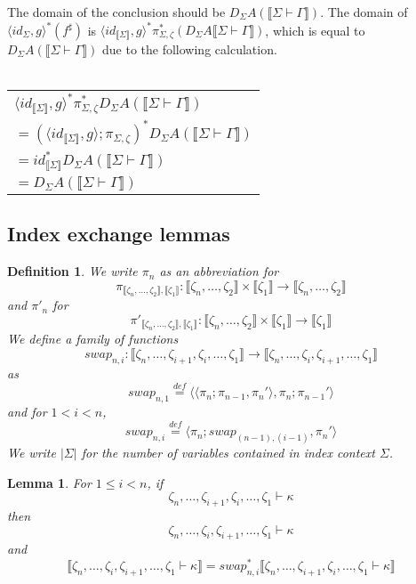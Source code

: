 \documentclass{article}
\newtheorem{lemma}{Lemma}
\newtheorem{definition}{Definition}
\newcommand{\sem}[1]{\llbracket #1 \rrbracket}
\newcommand{\defeq}{\overset{\mathit{def}}{=}}
\begin{document}
\subsubsection*{}

The domain of the conclusion should be $D_{\Sigma}A(\sem{\Sigma \vdash \Gamma})$. The domain of $\langle \mathit{id}_{\Sigma}, g \rangle^*(f^\sharp)$ is $\langle \mathit{id}_{\sem{\Sigma}}, g \rangle^* \pi_{\Sigma,\zeta}^*(D_{\Sigma} A \sem{\Sigma \vdash \Gamma})$, which is equal to $D_{\Sigma}A(\sem{\Sigma \vdash \Gamma})$ due to the following calculation.\\~\\
\begin{tabu}{l}
$\langle \mathit{id}_{\sem{\Sigma}}, g \rangle^* \pi_{\Sigma,\zeta}^* D_{\Sigma} A (\sem{\Sigma \vdash \Gamma})$ \\
$= (\langle \mathit{id}_{\sem{\Sigma}}, g \rangle; \pi_{\Sigma,\zeta})^* D_{\Sigma} A (\sem{\Sigma \vdash \Gamma})$ \\
$= id_{\sem{\Sigma}}^* D_{\Sigma} A (\sem{\Sigma \vdash \Gamma})$ \\
$= D_{\Sigma} A (\sem{\Sigma \vdash \Gamma})$
\end{tabu}

\subsection*{Index exchange lemmas}

\begin{definition}
We write $\pi_n$ as an abbreviation for $$\pi_{\sem{\zeta_n,\ldots,\zeta_{2}},\sem{\zeta_1}} : \sem{\zeta_n,\ldots,\zeta_{2}} \times \sem{\zeta_1} \to \sem{\zeta_n,\ldots,\zeta_{2}}$$ and $\pi'_n$ for $$\pi'_{\sem{\zeta_n,\ldots,\zeta_{2}},\sem{\zeta_1}} : \sem{\zeta_n,\ldots,\zeta_{2}} \times \sem{\zeta_1} \to \sem{\zeta_1}$$ We define a family of functions $$\mathit{swap}_{n,i} : \sem{\zeta_n,\ldots,\zeta_{i+1},\zeta_i,\ldots,\zeta_1} \to \sem{\zeta_n,\ldots,\zeta_i,\zeta_{i+1},\ldots,\zeta_1}$$ as $$\mathit{swap}_{n,1} \defeq \langle \langle \pi_n; \pi_{n-1}, \pi_n' \rangle, \pi_n;\pi_{n-1}' \rangle$$ and for $1 < i < n$, $$\mathit{swap}_{n,i} \defeq \langle \pi_n;\mathit{swap}_{(n-1),(i-1)}, \pi_n' \rangle$$
We write $|\Sigma|$ for the number of variables contained in index context $\Sigma$.
\end{definition}

\begin{lemma}
For $1 \leq i < n$, if $$\zeta_n,\ldots,\zeta_{i+1},\zeta_i,\ldots,\zeta_1 \vdash \kappa$$ then $$\zeta_n,\ldots,\zeta_{i},\zeta_{i+1},\ldots,\zeta_1 \vdash \kappa$$ and $$\sem{\zeta_n,\ldots,\zeta_{i},\zeta_{i+1},\ldots,\zeta_1 \vdash \kappa} = \mathit{swap}_{n,i}^* \sem{\zeta_n,\ldots,\zeta_{i+1},\zeta_i,\ldots,\zeta_1 \vdash \kappa}$$
\label{lemma:kwf-exchng}
\end{lemma}
 
\end{document}
